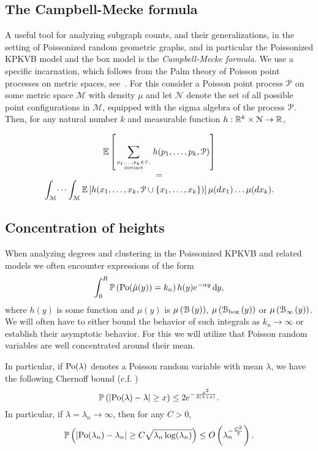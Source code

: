 \subsection{The Campbell-Mecke formula}

A useful tool for analyzing subgraph counts, and their generalizations, in the 
setting of Poissonized random geometric graphs, and in particular the Poissonized KPKVB model and the box 
model is the \emph{Campbell-Mecke formula}. 
We use a specific incarnation, which follows from the Palm theory of Poisson point processes on metric 
spaces, see~\cite{last2017lectures}. For this consider a Poisson point process ${\mathcal P}$ on some metric 
space $\mathcal{M}$ with density $\mu$ and let $\mathcal{N}$ denote the set of all possible point configurations 
in $\mathcal{M}$, equipped with the sigma algebra of the process ${\mathcal P}$. 
Then, for any natural number $k$ and measurable function $h : {\mathbb R}^k \times \mathcal{N} \to {\ensuremath{\mathbb R}}$,

\begin{equation}\label{eq:def_campbell_mecke}
\begin{array}{c}
\displaystyle	\mathbb{E}\left[\sum_{p_1, \dots, p_k \in {\mathcal P}, \atop \text{distinct}} h(p_1, \dots, p_k, {\mathcal P})\right] \\
= \\
\displaystyle \int_{\mathcal{M}} \dots \int_{\mathcal{M}} \mathbb{E}\left[h(x_1,\dots, x_k, {\mathcal P}\cup\{x_1,\dots,x_k\})\right] \mu(dx_1)\dots\mu(dx_k).
\end{array}
\end{equation}

\subsection{Concentration of heights}

When analyzing degrees and clustering in the Poissonized KPKVB and related models we often encounter expressions of the form
\begin{equation}\label{eq:example_poisson_integral}
	\int_{0}^R \mathbb{P}\left({\mathrm{Po}}(\hat{\mu}(y)) = k_n\right) h(y) e^{-\alpha y} \operatorname{\mathrm{d}\hspace{-2pt}} y,
\end{equation}
where $h(y)$ is some function and $\hat{\mu}(y)$ is $\mu\left({\mathcal B}\left(y\right)\right)$, $\mu\left({\mathcal B}_{\text{box}}\left(y\right)\right)$ or $\mu\left({\mathcal B}_{\infty}\left(y\right)\right)$. We will often have to either bound the behavior of such integrals as $k_n \to \infty$ or establish their asymptotic behavior. For this we will utilize that Poisson random variables are well concentrated around their mean. 

In particular, if ${\mathrm{Po}}(\lambda)$ denotes a Poisson random variable with mean $\lambda$, we have the following Chernoff bound (c.f. \cite[Lemma 1.2]{penrose2003random})
\begin{equation}\label{eq:def_chernoff_bound_poisson}
	\mathbb{P}\left(\left|\mathrm{Po}(\lambda) - \lambda\right| \ge x\right) \le 2e^{-\frac{x^2}{2(\lambda + x)}}.
\end{equation}
In particular, if $\lambda = \lambda_n \to \infty$, then for any $C>0$,
\begin{equation}\label{eq:def_chernoff_bound_poisson_C}
	\mathbb{P}\left(\left|\mathrm{Po}(\lambda_n) - \lambda_n\right| \ge C \sqrt{\lambda_n\log(\lambda_n)}\right) \le O\left(\lambda_n^{-\frac{C^2}{2}}\right).
\end{equation}

